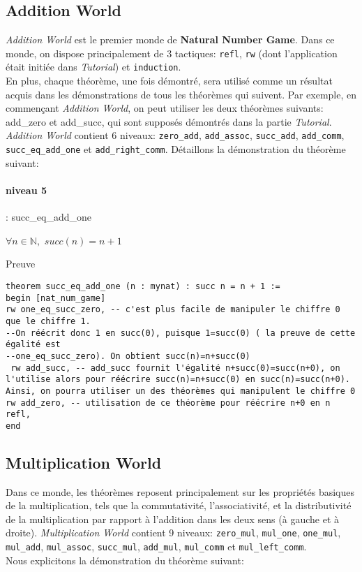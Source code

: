\subsection{Addition World}
\textit{Addition World} est le premier monde de \textbf{Natural Number Game}. Dans ce monde, on dispose principalement de 3 tactiques: \texttt{refl}, \texttt{rw} (dont l'application était initiée dans \textit{Tutorial}) et \texttt{induction}.\\
En plus, chaque théorème, une fois démontré, sera utilisé comme un résultat acquis dans les démonstrations de tous les théorèmes qui suivent. Par exemple, en commençant \textit{Addition World}, on peut utiliser les deux théorèmes suivants: add\_zero et add\_succ, qui sont supposés démontrés dans la partie \textit{Tutorial}.
\textit{Addition World} contient 6 niveaux: \texttt{zero\_add}, \texttt{add\_assoc}, \texttt{succ\_add}, \texttt{add\_comm}, \texttt{succ\_eq\_add\_one} et \texttt{add\_right\_comm}.
Détaillons la démonstration du théorème suivant:\\
\paragraph{niveau 5} : succ\_eq\_add\_one \begin{center}   $\forall n \in \mathbb{N},$  $succ(n)=n+1$ \end{center}
Preuve
\begin{verbatim}
theorem succ_eq_add_one (n : mynat) : succ n = n + 1 :=
begin [nat_num_game]
rw one_eq_succ_zero, -- c'est plus facile de manipuler le chiffre 0 que le chiffre 1. 
--On réécrit donc 1 en succ(0), puisque 1=succ(0) ( la preuve de cette égalité est
--one_eq_succ_zero). On obtient succ(n)=n+succ(0)
 rw add_succ, -- add_succ fournit l'égalité n+succ(0)=succ(n+0), on l'utilise alors pour réécrire succ(n)=n+succ(0) en succ(n)=succ(n+0). Ainsi, on pourra utiliser un des théorèmes qui manipulent le chiffre 0
rw add_zero, -- utilisation de ce théorème pour réécrire n+0 en n
refl,
end
\end{verbatim}
\subsection{Multiplication World}
Dans ce monde, les théorèmes reposent principalement sur les propriétés basiques de la multiplication, tels que la commutativité, l'associativité, et la distributivité de la multiplication par rapport à l'addition dans les deux sens (à gauche et à droite). \textit{Multiplication World} contient 9 niveaux: \texttt{zero\_mul}, \texttt{mul\_one}, \texttt{one\_mul}, \texttt{mul\_add}, \texttt{mul\_assoc}, \texttt{succ\_mul}, \texttt{add\_mul}, \texttt{mul\_comm} et \texttt{mul\_left\_comm}.\\ Nous explicitons la démonstration du théorème suivant: \\

